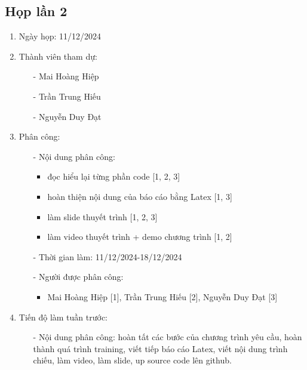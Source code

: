\begin{enumerate}
    \section{Họp lần 2}
        \begin{enumerate}
            \item Ngày họp: 11/12/2024
            \item Thành viên tham dự:
                \begin{enumerate}
                    \item[-] Mai Hoàng Hiệp
                    \item[-] Trần Trung Hiếu
                    \item[-] Nguyễn Duy Đạt
                \end{enumerate}
            \item Phân công:
                \begin{enumerate}
                    \item[-] Nội dung phân công:
                    \begin{itemize}
                        \item đọc hiểu lại từng phần code [1, 2, 3]
                        \item hoàn thiện nội dung của báo cáo bằng Latex [1, 3]
                        \item làm slide thuyết trình [1, 2, 3]
                        \item làm video thuyết trình + demo chương trình [1, 2]
                    \end{itemize}
                    \item[-] Thời gian làm: 11/12/2024-18/12/2024
                    \item[-] Người được phân công:
                    \begin{itemize}
                        \item Mai Hoàng Hiệp [1], Trần Trung Hiếu [2], Nguyễn Duy Đạt [3]
                    \end{itemize}
                \end{enumerate}
            \item Tiến độ làm tuần trước:
                \begin{enumerate}
                    \item[-] Nội dung phân công: hoàn tất các bước của chương trình yêu cầu, hoàn thành quá trình training, viết tiếp báo cáo Latex, viết nội dung trình chiếu, làm video, làm slide, up source code lên github.

\end{enumerate}
\end{enumerate}
\end{enumerate}
